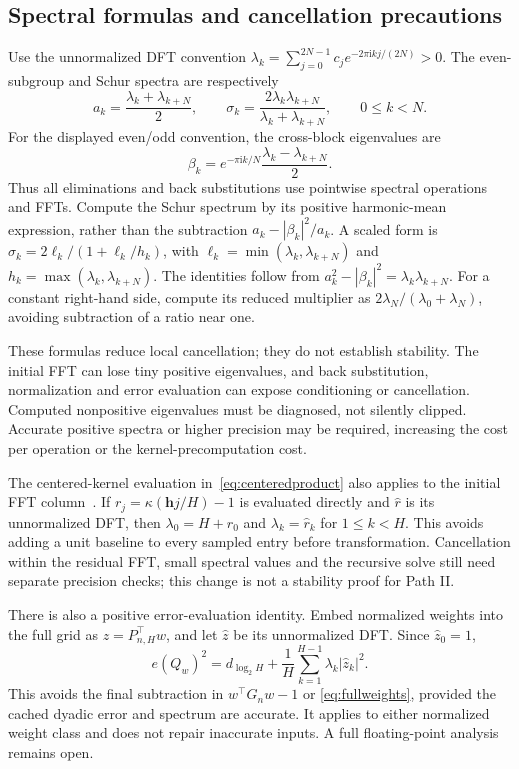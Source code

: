 \documentclass[11pt]{article}
\newcommand{\ii}{\mathrm{i}}
\newcommand{\bh}{\boldsymbol{h}}
\begin{document}
\subsection{Spectral formulas and cancellation precautions}
Use the unnormalized DFT convention
$\lambda_k=\sum_{j=0}^{2N-1}c_j e^{-2\pi\ii kj/(2N)}>0$.
The even-subgroup and Schur spectra are respectively
\begin{equation}\label{eq:pairedspectra}
 a_k=\frac{\lambda_k+\lambda_{k+N}}2,\qquad
 \sigma_k=\frac{2\lambda_k\lambda_{k+N}}
                 {\lambda_k+\lambda_{k+N}},
 \qquad 0\le k<N.
\end{equation}
For the displayed even/odd convention, the cross-block eigenvalues are
\[
 \beta_k=e^{-\pi\ii k/N}
          \frac{\lambda_k-\lambda_{k+N}}2.
\]
Thus all eliminations and back substitutions use pointwise spectral
operations and FFTs. Compute the Schur spectrum by its positive
harmonic-mean expression, rather than the subtraction
$a_k-|\beta_k|^2/a_k$. A scaled form is
$\sigma_k=2\ell_k/(1+\ell_k/h_k)$, with
$\ell_k=\min(\lambda_k,\lambda_{k+N})$ and
$h_k=\max(\lambda_k,\lambda_{k+N})$.
The identities follow from
$a_k^2-|\beta_k|^2=\lambda_k\lambda_{k+N}$.
For a constant right-hand side, compute its reduced multiplier as
$2\lambda_N/(\lambda_0+\lambda_N)$, avoiding subtraction of a ratio
near one.

These formulas reduce local cancellation; they do not establish
stability. The initial FFT can lose tiny positive eigenvalues, and
back substitution, normalization and error evaluation can expose
conditioning or cancellation. Computed nonpositive eigenvalues must
be diagnosed, not silently clipped. Accurate positive spectra or
higher precision may be required, increasing the cost per operation
or the kernel-precomputation cost.

The centered-kernel evaluation in~\eqref{eq:centeredproduct} also
applies to the initial FFT column~\cite[Section~4.4]{JH19}.
If $r_j=\kappa(\bh j/H)-1$ is evaluated directly and $\widehat r$
is its unnormalized DFT, then
$\lambda_0=H+\widehat r_0$ and $\lambda_k=\widehat r_k$ for
$1\le k<H$. This avoids adding a unit baseline to every sampled
entry before transformation. Cancellation within the residual FFT,
small spectral values and the recursive solve still need separate
precision checks; this change is not a stability proof for Path II.

There is also a positive error-evaluation identity. Embed normalized
weights into the full grid as $z=P_{n,H}^\top w$, and let $\widehat z$
be its unnormalized DFT. Since $\widehat z_0=1$,
\begin{equation}\label{eq:positiveerror}
 e(Q_w)^2=d_{\log_2H}
       +\frac1H\sum_{k=1}^{H-1}\lambda_k|\widehat z_k|^2.
\end{equation}
This avoids the final subtraction in $w^\top G_nw-1$ or
\eqref{eq:fullweights}, provided the cached dyadic error and spectrum
are accurate. It applies to either normalized weight class and does
not repair inaccurate inputs. A full floating-point analysis remains open.
\end{document}
